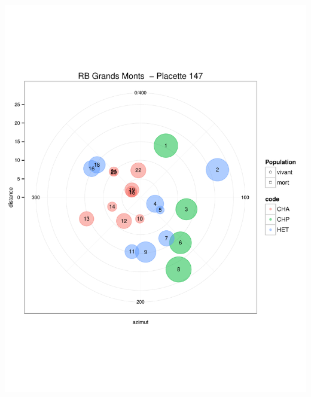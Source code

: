 \documentclass[a4paper]{book}\usepackage[]{graphicx}\usepackage[]{color}
\makeatletter
\def\maxwidth{ %
  \ifdim\Gin@nat@width>\linewidth
    \linewidth
  \else
    \Gin@nat@width
  \fi
}
\newenvironment{knitrout}{}{} %
\makeatother
\begin{document}
\begin{knitrout}
{\centering \includegraphics[width=\maxwidth]{Figures/PlanArbres-13} 

}





\end{knitrout}
\end{document}
